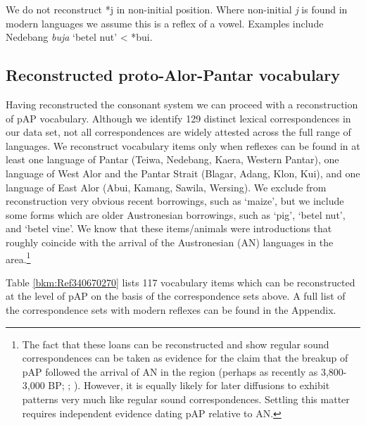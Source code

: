 We do not reconstruct *j in non-initial position. Where non-initial \textit{j }is found in modern languages we assume this is a reflex of a vowel. Examples include Nedebang \textit{buja} `betel nut' {\textless} *bui. 

\subsection{ Reconstructed proto-Alor-Pantar vocabulary}
Having reconstructed the consonant system we can proceed with a reconstruction of pAP vocabulary. Although we identify 129 distinct lexical correspondences in our data set, not all correspondences are widely attested across the full range of languages. We reconstruct vocabulary items only when reflexes can be found in at least one language of Pantar (Teiwa, Nedebang, Kaera, Western Pantar), one language of West Alor and the Pantar Strait (Blagar, Adang, Klon, Kui), and one language of East Alor (Abui, Kamang, Sawila, Wersing). We exclude from reconstruction very obvious recent borrowings, such as `maize', but we include some forms which are older Austronesian borrowings, such as `pig', `betel nut', and `betel vine'. We know that these items/animals were introductions that roughly coincide with the arrival of the Austronesian (AN) languages in the area.\footnote{ The fact that these loans can be reconstructed and show regular sound correspondences can be taken as evidence for the 
claim that the breakup of pAP followed the arrival of AN in the region (perhaps as recently as 3,800-3,000 BP; \citet[511]{Spriggs2011}; \citet[100]{Pawley2005}). However, it is equally likely for later diffusions to exhibit patterns very much like regular sound correspondences. Settling this matter requires independent evidence dating pAP relative to AN.} 

Table \ref{bkm:Ref340670270} lists 117 vocabulary items which can be reconstructed at the level of pAP on the basis of the correspondence sets above. A full list of the correspondence sets with modern reflexes can be found in the Appendix.



